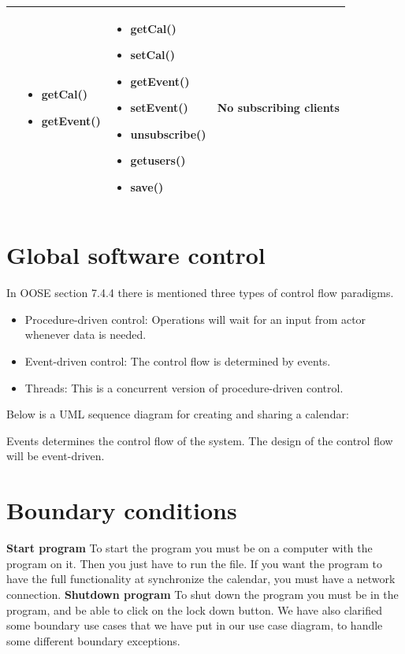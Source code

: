 \begin{tabular}{|p{2.9cm}|p{3.6cm}|p{3.6cm}|p{3.6cm}|}
& 
\begin{itemize}
\item getCal()
\item getEvent()
\end{itemize} 
& 
\begin{itemize}
\item getCal()
\item setCal() 
\item getEvent()
\item setEvent()
\item unsubscribe()
\item getusers()
\item save()
\end{itemize}
&
No subscribing clients
 \\ \hline
\end{tabular}

\newpage
\section*{Global software control}

In OOSE section 7.4.4 there is mentioned three types of control flow paradigms. 

\begin{itemize}
	\item Procedure-driven control: Operations will wait for an input from actor whenever data is needed. 
	\item Event-driven control: The control flow is determined by events.
	\item Threads: This is a concurrent version of procedure-driven control.
\end{itemize}

 Below is a UML sequence diagram for creating and sharing a calendar:

 Events determines the control flow of the system. The design of the control flow will be event-driven. 

\newpage
\section*{Boundary conditions}
\textbf{Start program}
To start the program you must be on a computer with the program on it. Then you just have to run the file. If you want the program to have the full functionality at synchronize the calendar, you must have a network connection. 
\newline
\newline
\textbf{Shutdown program}
To shut down the program you must be in the program, and be able to click on the lock down button. 
We have also clarified some boundary use cases that we have put in our use case diagram, to handle some different boundary exceptions. 


